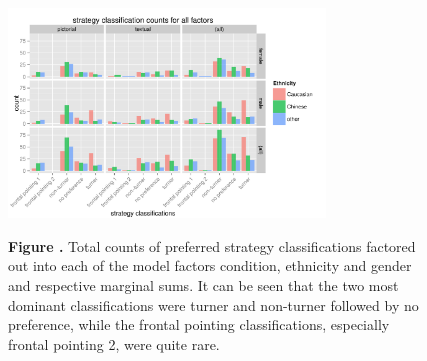\documentclass{frontiersSCNS} %
\begin{document}
\begin{figure}[h!]
\begin{center}
    \includegraphics[width=0.75\textwidth]{figures/histOverview.pdf}
\end{center}
\textbf{\label{fig:04} Figure .}{  Total counts of preferred strategy classifications factored out into each of the model factors condition, ethnicity and gender and respective marginal sums. It can be seen that the two most dominant classifications were turner and non-turner followed by no preference, while the frontal pointing classifications, especially frontal pointing 2, were quite rare.}
   \label{fig:HistOverview}
\end{figure}
\end{document}
